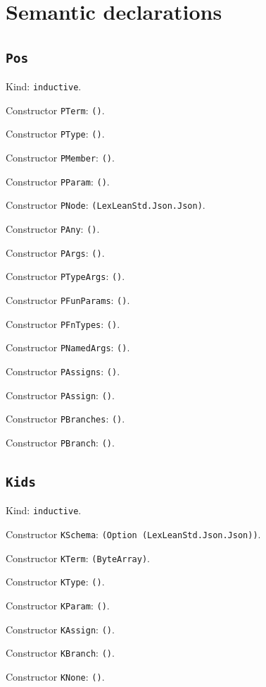 \documentclass[11pt]{article}
\begin{document}
\section*{Semantic declarations}
\subsection*{\texttt{Pos}}
\noindent Kind: \texttt{inductive}.\par
\noindent Constructor \texttt{PTerm}: \texttt{()}.\par
\noindent Constructor \texttt{PType}: \texttt{()}.\par
\noindent Constructor \texttt{PMember}: \texttt{()}.\par
\noindent Constructor \texttt{PParam}: \texttt{()}.\par
\noindent Constructor \texttt{PNode}: \texttt{(LexLeanStd.Json.Json)}.\par
\noindent Constructor \texttt{PAny}: \texttt{()}.\par
\noindent Constructor \texttt{PArgs}: \texttt{()}.\par
\noindent Constructor \texttt{PTypeArgs}: \texttt{()}.\par
\noindent Constructor \texttt{PFunParams}: \texttt{()}.\par
\noindent Constructor \texttt{PFnTypes}: \texttt{()}.\par
\noindent Constructor \texttt{PNamedArgs}: \texttt{()}.\par
\noindent Constructor \texttt{PAssigns}: \texttt{()}.\par
\noindent Constructor \texttt{PAssign}: \texttt{()}.\par
\noindent Constructor \texttt{PBranches}: \texttt{()}.\par
\noindent Constructor \texttt{PBranch}: \texttt{()}.\par
\subsection*{\texttt{Kids}}
\noindent Kind: \texttt{inductive}.\par
\noindent Constructor \texttt{KSchema}: \texttt{(Option (LexLeanStd.Json.Json))}.\par
\noindent Constructor \texttt{KTerm}: \texttt{(ByteArray)}.\par
\noindent Constructor \texttt{KType}: \texttt{()}.\par
\noindent Constructor \texttt{KParam}: \texttt{()}.\par
\noindent Constructor \texttt{KAssign}: \texttt{()}.\par
\noindent Constructor \texttt{KBranch}: \texttt{()}.\par
\noindent Constructor \texttt{KNone}: \texttt{()}.\par
\end{document}
